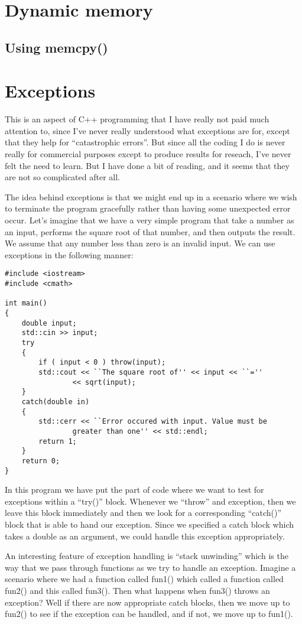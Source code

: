 \section{Dynamic memory}

\subsection{Using memcpy()}

\section{Exceptions}
\label{sec:exceptions}

This is an aspect of C++ programming that I have really not paid much
attention to, since I've never really understood what exceptions are
for, except that they help for ``catastrophic errors''. But since all
the coding I do is never really for commercial purposes except to
produce results for reseach, I've never felt the need to learn. But I
have done a bit of reading, and it seems that they are not so
complicated after all. 

The idea behind exceptions is that we might end up in a scenario where
we wish to terminate the program gracefully rather than having some
unexpected error occur. Let's imagine that we have a very simple
program that take a number as an input, performs the square root of
that number, and then outputs the result. We assume that any number
less than zero is an invalid input. We can use exceptions in the
following manner:
\begin{lstlisting}
#include <iostream>
#include <cmath>

int main()
{
	double input;
	std::cin >> input;
	try
	{
		if ( input < 0 ) throw(input);
		std::cout << ``The square root of'' << input << ``=''
                << sqrt(input);
	}
	catch(double in)
	{
		std::cerr << ``Error occured with input. Value must be
                greater than one'' << std::endl;
		return 1;
	}
	return 0;
}
\end{lstlisting}
In this program we have put the part of code where we want to test for
exceptions within a ``try()'' block. Whenever we ``throw'' and
exception, then we leave this block immediately and then we look for a
corresponding ``catch()'' block that is able to hand our
exception. Since we specified a catch block which takes a double as an
argument, we could handle this exception appropriately. 

An interesting feature of exception handling is ``stack unwinding''
which is the way that we pass through functions as we try to handle an
exception. Imagine a scenario where we had a function called fun1()
which called a function called fun2() and this called fun3(). Then
what happens when fun3() throws an exception? Well if there are now
appropriate catch blocks, then we move up to fun2() to see if the
exception can be handled, and if not, we move up to fun1(). 

